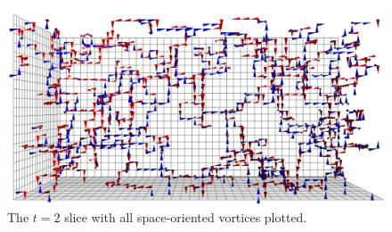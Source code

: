 {\centering
\begin{figure}[htb!]
\includegraphics[width=\linewidth]{Plaq_CFG95_T02.png}
\caption{\label{fig:PlaqT02}The $t=2$ slice with all space-oriented vortices plotted.}
\end{figure}
}
%
